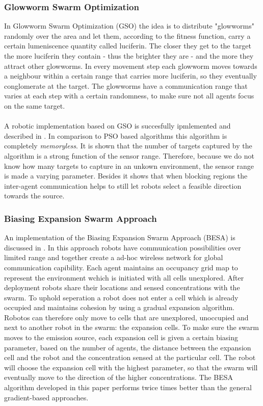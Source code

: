 	\subsubsection{Glowworm Swarm Optimization}
		In Glowworm Swarm Optimization (GSO) the idea is to distribute "glowworms" randomly over the area and let them, according to the fitness function, carry a certain lumeniscence quantity called luciferin. 
		The closer they get to the target the more luciferin they contain - thus the brighter they are - and the more they attract other glowworms. 
		In every movement step each glowworm moves towards a neighbour within a certain range that carries more luciferin, so they eventually conglomerate at the target. 
		The glowworms have a communication range that varies at each step with a certain randomness, to make sure not all agents focus on the same target. \cite{krishnanand2005glowworm}\\
		\\
		A robotic implementation based on GSO is succesfully ipmlemented and described in \cite{krishnanand2005detection}.
		In comparison to PSO based algorithms this algorithm is completely \emph{memoryless}.
		It is shown that the number of targets captured by the algorithm is a strong function of the sensor range.
		Therefore, because we do not know how many targets to capture in an unkown environment, the sensor range is made a varying parameter.
		Besides it shows that when blocking regions the inter-agent communication helps to still let robots select a feasible direction towards the source.

	\subsubsection{Biasing Expansion Swarm Approach}
		An implementation of the Biasing Expansion Swarm Approach (BESA) is discussed in \cite{cui2004swarm}.
		In this approach robots have communication possibilities over limited range and together create a ad-hoc wireless network for global communication capibility.
		Each agent maintains an occupancy grid map to represent the environment wchich is initiated with all cells unexplored.
		After deployment robots share their locations and sensed concentrations with the swarm.
		To uphold seperation a robot does not enter a cell which is already occupied and maintains cohesion by using a gradual expansion algorithm.
		Robotos can therefore only move to cells that are unexplored, unoccupied and next to another robot in the swarm: the expansion cells.
		To make sure the swarm moves to the emission source, each expansion cell is given a certain biasing parameter, based on the number of agents, the distance between the expansion cell and the robot and the concentration sensed at the particular cell.
		The robot will choose the expansion cell with the highest parameter, so that the swarm will eventually move to the direction of the higher concentrations.
		The BESA algorithm developed in this paper performs twice times better than the general gradient-based approaches.

